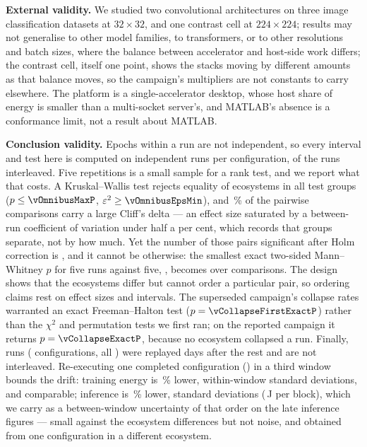 \textbf{External validity.} We studied two convolutional architectures on three
image classification datasets at $32\times32$, and one contrast cell at
$224\times224$; results may not generalise to other model families, to
transformers, or to other resolutions and batch sizes, where the balance between
accelerator and host-side work differs; the contrast cell, itself one point,
shows the stacks moving by different amounts as that balance moves, so the
campaign's multipliers are not constants to carry elsewhere. The platform is a single-accelerator desktop, whose host share of energy is
smaller than a multi-socket server's, and MATLAB's absence is a conformance
limit, not a result about MATLAB.

\textbf{Conclusion validity.} Epochs within a run are not independent, so every
interval and test here is computed on \vRepetitions{} independent runs per
configuration, \vInterleavedRuns{} of the \vRuns{} runs interleaved. Five
repetitions is a small sample for a rank test, and we report what that costs. A
Kruskal--Wallis test rejects equality of ecosystems in all \vOmnibusBlocks{}
test groups ($p \le \vOmnibusMaxP$, $\varepsilon^2 \ge \vOmnibusEpsMin$), and
\vPairsLargePct\,\% of the \vPairsTotal{} pairwise comparisons carry a large
Cliff's delta --- an effect size saturated by a between-run coefficient of
variation under half a per cent, which records that groups separate, not by how
much. Yet the number of those pairs significant after Holm correction is
\vPairsSignificant, and it cannot be otherwise: the smallest exact two-sided Mann--Whitney $p$ for
five runs against five, \vPairsMinRawP, becomes \vPairsMinHolmP{} over
\vPairsPerBlock{} comparisons. The design shows that the ecosystems differ but
cannot order a particular pair, so ordering claims rest on effect sizes and
intervals. The superseded
campaign's collapse rates warranted an exact Freeman--Halton test
($p = \vCollapseFirstExactP$) rather than the $\chi^2$ and permutation tests we
first ran; on the reported campaign it returns $p = \vCollapseExactP$, because no
ecosystem collapsed a run. Finally, \vLateRuns{} runs (\vLateConfigurations{}
configurations, all \vLateEcosystems{}) were replayed \vLateGapDays{} days after
the rest and are not interleaved. Re-executing one completed configuration
(\vCalibConfig) in a third window bounds the drift: training energy is
\vCalibTrainDiffPct\,\% lower, \vCalibTrainSD{} within-window standard
deviations, and comparable; inference is \vCalibInferDiffPct\,\% lower,
\vCalibInferSD{} standard deviations (\vCalibInferDiffJ\,\si{\joule} per block),
which we carry as a between-window uncertainty of that order on the late
inference figures --- small against the ecosystem differences but not noise,
and obtained from one configuration in a different ecosystem.

